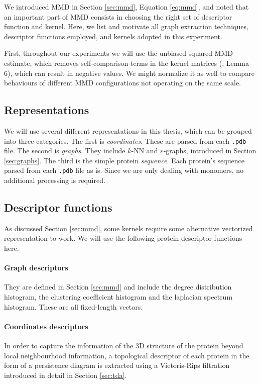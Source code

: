 We introduced MMD in Section \ref{sec:mmd}, Equation \ref{eq:mmd}, and
noted that an important part of MMD consists in choosing the right set of
descriptor function and kernel. Here, we list and motivate all graph extraction techniques,
descriptor functions employed, and kernels adopted in this experiment.

First, throughout our experiments we will use the unbiased squared MMD estimate, which
removes self-comparison terms in the kernel matrices (\cite{gretton2012kernel},
Lemma 6), which can result in negative values. We might normalize it as
well to compare behaviours of different MMD configurations not operating on the
same scale.

\subsection{Representations}
We will use several different representations in this thesis, which can be
grouped into three categories. The first is \emph{coordinates}. These are parsed
from each \texttt{.pdb} file. The second is \emph{graphs}. They include $k$-NN
and $\varepsilon$-graphs, introduced in Section \ref{sec:graphs}. The third is
the simple protein \emph{sequence}. Each protein's sequence parsed from each
\texttt{.pdb} file as is. Since we are only dealing with monomers, no additional
processing is required.

\subsection{Descriptor functions}\label{sec:descriptors}

As discussed Section \ref{sec:mmd}, some kernels require some alternative vectorized
representation to work. We will use the following protein descriptor functions
here.


\paragraph{Graph descriptors} They are defined in Section \ref{sec:mmd} and include
  the degree distribution histogram, the clustering coefficient histogram and
  the laplacian spectrum histogram. These are all fixed-length vectors.
\paragraph{Coordinates descriptors} In order to capture the information of the
3D structure of the protein beyond local neighbourhood information, a
topological descriptor of each protein in the form of a persistence diagram is
extracted using a Vietoris-Rips filtration introduced in detail in Section \ref{sec:tda}.
